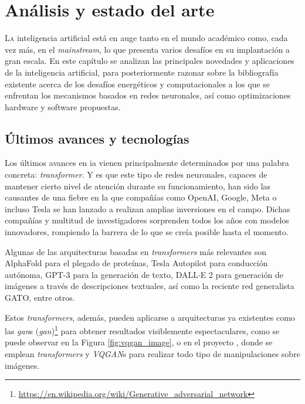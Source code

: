 \chapter{Análisis y estado del arte}
\label{chap:analisis_estado_arte}

\lettrine{L}{a} inteligencia artificial está en auge tanto en el mundo académico como, cada vez más, en el \textit{mainstream}, lo que presenta varios desafíos en su implantación a gran escala. En este capítulo se analizan las principales novedades y aplicaciones de la inteligencia artificial, para posteriormente razonar sobre la bibliografía existente acerca de los desafíos energéticos y computacionales a los que se enfrentan los mecanismos basados en redes neuronales, así como optimizaciones hardware y software propuestas.

\section{Últimos avances y tecnologías}
\label{sec:ultimos_avances_tecnologias}
Los últimos avances en \acrshort{ia} vienen principalmente determinados por una palabra concreta: \textit{transformer}. Y es que este tipo de redes neuronales, capaces de mantener cierto nivel de atención \cite{vaswani2017attention_all_you_need} durante su funcionamiento, han sido las causantes de una fiebre en la que compañías como OpenAI, Google, Meta o incluso Tesla se han lanzado a realizan amplias inversiones en el campo. Dichas compañías y multitud de investigadores sorprenden todos los años con modelos innovadores, rompiendo la barrera de lo que se creía posible hasta el momento.

Algunas de las arquitecturas basadas en \textit{transformers} más relevantes son AlphaFold para el plegado de proteínas, Tesla Autopilot para conducción autónoma, GPT-3 para la generación de texto, DALL$\cdot$E 2 para generación de imágenes a través de descripciones textuales, así como la reciente red generalista GATO, entre otros.

Estos \textit{transformers}, además, pueden aplicarse a arquitecturas ya existentes como las \textit{\acrshort{gan}}s (\textit{\acrlong{gan}})\footnote{\url{https://en.wikipedia.org/wiki/Generative\_adversarial\_network}} para obtener resultados visiblemente espectaculares, como se puede observar en la Figura \ref{fig:vqgan_image}, o en el proyecto \cite{chang2022maskgit}, donde se emplean \textit{transformers} y \textit{VQGAN}s para realizar todo tipo de manipulaciones sobre imágenes.

